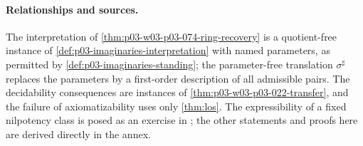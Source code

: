 \paragraph{Relationships and sources.}
The interpretation of \cref{thm:p03-w03-p03-074-ring-recovery} is a
quotient-free instance of \cref{def:p03-imaginaries-interpretation} with
named parameters, as permitted by \cref{def:p03-imaginaries-standing}; the
parameter-free translation \(\sigma^{\sharp}\) replaces the parameters by
a first-order description of all admissible pairs. The decidability
consequences are instances of \cref{thm:p03-w03-p03-022-transfer}, and
the failure of axiomatizability uses only \cref{thm:los}. The
expressibility of a fixed nilpotency class is posed as an exercise in
\cite[Chapter~V, \S1, Exercise~5(c), p.~201]{BurrisSankappanavar2012}; the
other statements and proofs here are derived directly in the annex.
